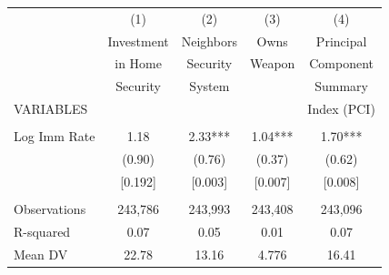\begin{tabular}{lcccc} \hline
 & (1) & (2) & (3) & (4) \\
 & Investment & Neighbors & Owns & Principal \\
 & in Home & Security & Weapon & Component \\
 & Security & System &  & Summary \\
VARIABLES &  &  &  & Index (PCI) \\ \hline
 &  &  &  &  \\
Log Imm Rate & 1.18 & 2.33*** & 1.04*** & 1.70*** \\
 & (0.90) & (0.76) & (0.37) & (0.62) \\
 & [0.192] & [0.003] & [0.007] & [0.008] \\
 &  &  &  &  \\
Observations & 243,786 & 243,993 & 243,408 & 243,096 \\
R-squared & 0.07 & 0.05 & 0.01 & 0.07 \\
 Mean DV & 22.78 & 13.16 & 4.776 & 16.41 \\ \hline
\end{tabular}

